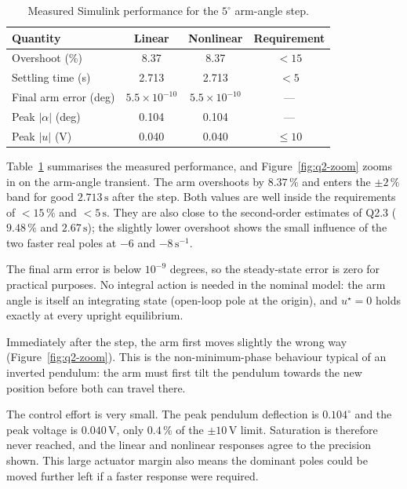 \documentclass[11pt,a4paper]{article}
\begin{document}
\begin{table}[htbp]
    \centering
    \caption{Measured Simulink performance for the $5^\circ$
    arm-angle step.}
    \label{tab:q2-performance}
    \begin{tabular}{lccc}
        \hline
        Quantity & Linear & Nonlinear & Requirement\\
        \hline
        Overshoot (\%)
            & 8.37 & 8.37 & $<15$\\
        Settling time (s)
            & 2.713 & 2.713 & $<5$\\
        Final arm error (deg)
            & $5.5\times10^{-10}$ & $5.5\times10^{-10}$ & ---\\
        Peak $|\alpha|$ (deg)
            & 0.104 & 0.104 & ---\\
        Peak $|u|$ (V)
            & 0.040 & 0.040 & $\leq10$\\
        \hline
    \end{tabular}
\end{table}

Table~\ref{tab:q2-performance} summarises the measured performance, and
Figure~\ref{fig:q2-zoom} zooms in on the arm-angle transient. The arm overshoots
by $8.37\,\%$ and enters the $\pm2\,\%$ band for good $2.713\,\mathrm{s}$ after
the step. Both values are well inside the requirements of $<15\,\%$ and
$<5\,\mathrm{s}$. They are also close to the second-order estimates of Q2.3
($9.48\,\%$ and $2.67\,\mathrm{s}$); the slightly lower overshoot shows the
small influence of the two faster real poles at $-6$ and $-8\,\mathrm{s}^{-1}$.

The final arm error is below $10^{-9}$ degrees, so the steady-state error is
zero for practical purposes. No integral action is needed in the nominal
model: the arm angle is itself an integrating state (open-loop pole at the
origin), and $u^\star=0$ holds exactly at every upright equilibrium.

Immediately after the step, the arm first moves slightly the wrong way
(Figure~\ref{fig:q2-zoom}). This is the non-minimum-phase behaviour typical of
an inverted pendulum: the arm must first tilt the pendulum towards the new
position before both can travel there.

The control effort is very small. The peak pendulum deflection is
$0.104^\circ$ and the peak voltage is $0.040\,\mathrm{V}$, only $0.4\,\%$ of
the $\pm10\,\mathrm{V}$ limit. Saturation is therefore never reached, and the
linear and nonlinear responses agree to the precision shown. This large
actuator margin also means the dominant poles could be moved further left if
a faster response were required.
\end{document}
